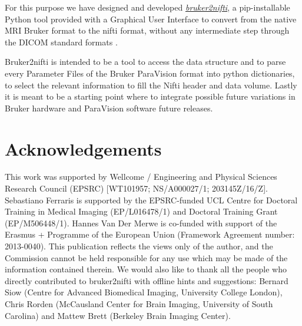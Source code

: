 \documentclass{article}
\begin{document}

For this purpose we have designed and developed \href{https://github.com/SebastianoF/bruker2nifti}{\emph{bruker2nifti}}, a pip-installable Python tool provided with a Graphical User Interface to convert from the native MRI Bruker format %
to the nifti format, without any intermediate step through the DICOM standard formats \cite{mustra2008overview}. %

Bruker2nifti is intended to be a tool to access the data structure and to parse every Parameter Files of the Bruker ParaVision format into python dictionaries, to select the relevant information to fill the Nifti header and data volume. Lastly it is meant to be a starting point where to integrate possible future variations in Bruker hardware and ParaVision software future releases.


\section{Acknowledgements}

This work was supported by Wellcome / Engineering and Physical Sciences Research Council (EPSRC) [WT101957; NS/A000027/1; 203145Z/16/Z]. Sebastiano Ferraris is supported by the EPSRC-funded UCL Centre for Doctoral Training in Medical Imaging (EP/L016478/1) and Doctoral Training Grant (EP/M506448/1).
Hannes Van Der Merwe is co-funded with support of the Erasmus + Programme of the European Union (Framework Agreement number: 2013-0040). This publication reflects the views only of the author, and the Commission cannot be held responsible for any use which may be made of the information contained therein. 
We would also like to thank all the people who directly contributed to bruker2nifti with offline hints and suggestions: Bernard Siow (Centre for Advanced Biomedical Imaging, University College London), Chris Rorden (McCausland Center for Brain Imaging, University of South Carolina) and Mattew Brett (Berkeley Brain Imaging Center).

{}

\end{document}
